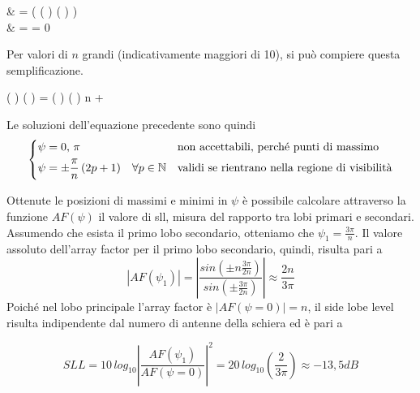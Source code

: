 			\begin{esp}
				& = \deriv{}{\psi} \left(
						\frac
							{ \sin(\frac{n}{2} \psi) }
							{ \sin( \frac{\psi}{2} ) }
					\right) \\
				& = \frac{1}{\sin^2 \left(\frac{\psi}{2}\right)} \left[
					\cos \left( \psi \right) \frac{n}{2} \sin\left(  \right)
					- \sin \left(\frac{n}{2} \psi \right) \cos\left( \frac{\psi}{2} \right)
					\right]
				 = 0
			\end{esp}

			Per valori di $n$ grandi (indicativamente maggiori di 10), si può compiere questa semplificazione.

			\begin{esp}
				\cos \left( \psi \right) \sin\left( \frac{\psi}{2} \right)
				=  \sin \left( \psi \right) \cos\left( \frac{\psi}{2} \right)
				 \quad \forall n \to +\infty
			\end{esp}

			Le soluzioni dell'equazione precedente sono quindi
			\begin{equation*}
				\begin{dcases}
					\psi = 0, \, \pi
						& \text{non accettabili, perché punti di massimo} \\
					\psi = \pm \frac{\pi}{n} \, (2p + 1) \quad \forall p \in \mathbb{N}
						& \text{validi se rientrano nella regione di visibilità}
				\end{dcases}
			\end{equation*}

			Ottenute le posizioni di massimi e minimi in $\psi$ è possibile calcolare attraverso la funzione $AF(\psi)$ il valore di \gls{sll}, misura del rapporto tra lobi primari e secondari.
			Assumendo che esista il primo lobo secondario, otteniamo che $\psi_1 = \frac{3\pi}{n}$. Il valore assoluto dell'array factor per il primo lobo secondario, quindi, risulta pari a
			\begin{equation}
				|AF(\psi_1) | = \left|\frac{sin\left(\pm n \frac{3 \pi}{2 n}\right)}{sin\left(\pm \frac{3\pi}{2 n}\right)}\right| \approx \frac{2n}{3\pi}
			\end{equation}
Poiché nel lobo principale l'array factor è $|AF(\psi=0)|=n$, il side lobe level risulta indipendente dal numero di antenne della schiera ed è pari a

\begin{equation}
	SLL=10\,log_{10}\left|\frac{AF(\psi_1)}{AF(\psi=0)}\right|^2 = 20\,log_{10}\left(\frac{2}{3\pi}\right) \approx -13,5dB
\end{equation}
